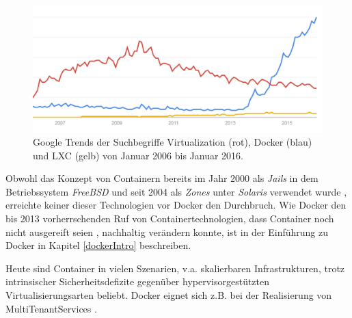 \documentclass[../main.tex]{subfiles}
\begin{document}
  \begin{figure}[h]
      \centering
      \includegraphics[width=1.0\textwidth]{./images/googletrend_dockerVirtualizationLXC.jpg}
      \caption{Google Trends der Suchbegriffe \glqq{}Virtualization\grqq{} (rot), \glqq{}Docker\grqq{} (blau) und \glqq{}LXC\grqq{} (gelb) von Januar 2006 bis Januar 2016\cite{googleTrends}.}
      \label{fig:overview_googleTrends}
  \end{figure}

  Obwohl das Konzept von Containern bereits im Jahr 2000 als \emph{Jails} in dem Betriebssystem \emph{FreeBSD} und seit 2004 als \emph{Zones} unter \emph{Solaris} verwendet wurde \cite{zonesReleasenotes}\cite{jailsReleasenotes}, erreichte keiner dieser Technologien vor Docker den Durchbruch. Wie Docker den bis 2013 vorherrschenden Ruf von Containertechnologien, dass Container noch nicht ausgereift seien \cite[S.8]{containerVirtPerformance}, nachhaltig verändern konnte, ist in der Einführung zu Docker in Kapitel \ref{dockerIntro} beschreiben.

  Heute sind Container in vielen Szenarien, v.a. skalierbaren Infrastrukturen, trotz intrinsischer Sicherheitsdefizite gegenüber hypervisorgestützten Virtualisierungsarten beliebt. Docker eignet sich z.B. bei der Realisierung von \glspl{MultiTenantService} \cite[S.6]{dockerBook}\cite{dockerUnderstandingDocker}.

\end{document}
